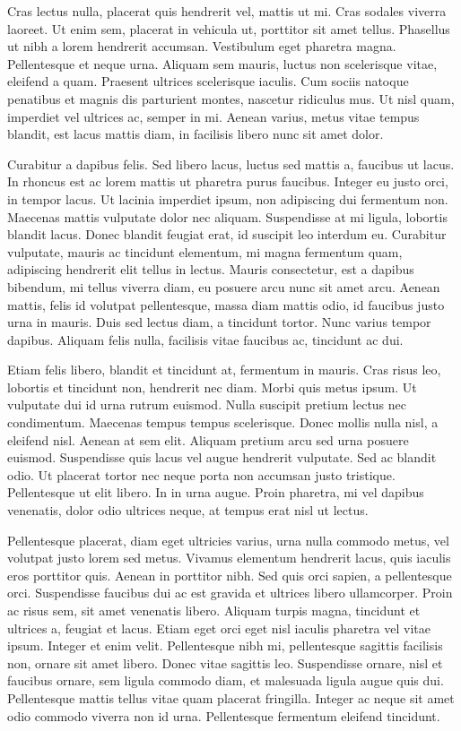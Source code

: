 \documentclass[a4paper]{article}
\begin{document}
Cras lectus nulla, placerat quis hendrerit vel, mattis ut mi. Cras sodales viverra laoreet. Ut enim sem, placerat in vehicula ut, porttitor sit amet tellus. Phasellus ut nibh a lorem hendrerit accumsan. Vestibulum eget pharetra magna. Pellentesque et neque urna. Aliquam sem mauris, luctus non scelerisque vitae, eleifend a quam. Praesent ultrices scelerisque iaculis. Cum sociis natoque penatibus et magnis dis parturient montes, nascetur ridiculus mus. Ut nisl quam, imperdiet vel ultrices ac, semper in mi. Aenean varius, metus vitae tempus blandit, est lacus mattis diam, in facilisis libero nunc sit amet dolor.

Curabitur a dapibus felis. Sed libero lacus, luctus sed mattis a, faucibus ut lacus. In rhoncus est ac lorem mattis ut pharetra purus faucibus. Integer eu justo orci, in tempor lacus. Ut lacinia imperdiet ipsum, non adipiscing dui fermentum non. Maecenas mattis vulputate dolor nec aliquam. Suspendisse at mi ligula, lobortis blandit lacus. Donec blandit feugiat erat, id suscipit leo interdum eu. Curabitur vulputate, mauris ac tincidunt elementum, mi magna fermentum quam, adipiscing hendrerit elit tellus in lectus. Mauris consectetur, est a dapibus bibendum, mi tellus viverra diam, eu posuere arcu nunc sit amet arcu. Aenean mattis, felis id volutpat pellentesque, massa diam mattis odio, id faucibus justo urna in mauris. Duis sed lectus diam, a tincidunt tortor. Nunc varius tempor dapibus. Aliquam felis nulla, facilisis vitae faucibus ac, tincidunt ac dui.

Etiam felis libero, blandit et tincidunt at, fermentum in mauris. Cras risus leo, lobortis et tincidunt non, hendrerit nec diam. Morbi quis metus ipsum. Ut vulputate dui id urna rutrum euismod. Nulla suscipit pretium lectus nec condimentum. Maecenas tempus tempus scelerisque. Donec mollis nulla nisl, a eleifend nisl. Aenean at sem elit. Aliquam pretium arcu sed urna posuere euismod. Suspendisse quis lacus vel augue hendrerit vulputate. Sed ac blandit odio. Ut placerat tortor nec neque porta non accumsan justo tristique. Pellentesque ut elit libero. In in urna augue. Proin pharetra, mi vel dapibus venenatis, dolor odio ultrices neque, at tempus erat nisl ut lectus.

Pellentesque placerat, diam eget ultricies varius, urna nulla commodo metus, vel volutpat justo lorem sed metus. Vivamus elementum hendrerit lacus, quis iaculis eros porttitor quis. Aenean in porttitor nibh. Sed quis orci sapien, a pellentesque orci. Suspendisse faucibus dui ac est gravida et ultrices libero ullamcorper. Proin ac risus sem, sit amet venenatis libero. Aliquam turpis magna, tincidunt et ultrices a, feugiat et lacus. Etiam eget orci eget nisl iaculis pharetra vel vitae ipsum. Integer et enim velit. Pellentesque nibh mi, pellentesque sagittis facilisis non, ornare sit amet libero. Donec vitae sagittis leo. Suspendisse ornare, nisl et faucibus ornare, sem ligula commodo diam, et malesuada ligula augue quis dui. Pellentesque mattis tellus vitae quam placerat fringilla. Integer ac neque sit amet odio commodo viverra non id urna. Pellentesque fermentum eleifend tincidunt.
\end{document}
